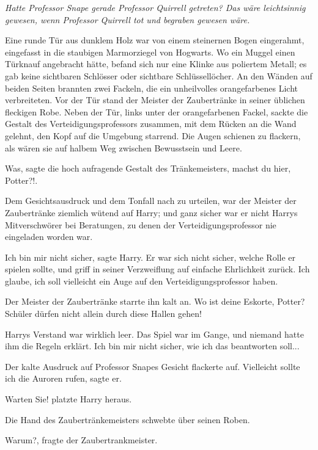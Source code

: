 \emph{Hatte Professor Snape gerade Professor Quirrell getreten? Das wäre
leichtsinnig gewesen, wenn Professor Quirrell tot und begraben gewesen wäre.}

Eine runde Tür aus dunklem Holz war von einem steinernen Bogen eingerahmt,
eingefasst in die staubigen Marmorziegel von Hogwarts. Wo ein Muggel einen
Türknauf angebracht hätte, befand sich nur eine Klinke aus poliertem Metall; es
gab keine sichtbaren Schlösser oder sichtbare Schlüssellöcher. An den Wänden auf
beiden Seiten brannten zwei Fackeln, die ein unheilvolles orangefarbenes Licht
verbreiteten. Vor der Tür stand der Meister der Zaubertränke in seiner üblichen
fleckigen Robe. Neben der Tür, links unter der orangefarbenen Fackel, sackte die
Gestalt des Verteidigungsprofessors zusammen, mit dem Rücken an die Wand
gelehnt, den Kopf auf die Umgebung starrend. Die Augen schienen zu flackern, als
wären sie auf halbem Weg zwischen Bewusstsein und Leere.

\glqq{}Was\grqq{}, sagte die hoch aufragende Gestalt des Tränkemeisters, \glqq{}
machst du hier, Potter?!\grqq{}.

Dem Gesichtsausdruck und dem Tonfall nach zu urteilen, war der Meister der
Zaubertränke ziemlich wütend auf Harry; und ganz sicher war er nicht Harrys
Mitverschwörer bei Beratungen, zu denen der Verteidigungsprofessor nie
eingeladen worden war.

\glqq{}Ich bin mir nicht sicher\grqq{}, sagte Harry. Er war sich nicht sicher,
welche Rolle er spielen sollte, und griff in seiner Verzweiflung auf einfache
Ehrlichkeit zurück. \glqq{}Ich glaube, ich soll vielleicht ein Auge auf den
Verteidigungsprofessor haben.\grqq{}

Der Meister der Zaubertränke starrte ihn kalt an. \glqq{}Wo ist deine Eskorte,
Potter? Schüler dürfen nicht allein durch diese Hallen gehen!\grqq{}

Harrys Verstand war wirklich leer. Das Spiel war im Gange, und niemand hatte ihm
die Regeln erklärt. \glqq{}Ich bin mir nicht sicher, wie ich das beantworten
soll...\grqq{}

Der kalte Ausdruck auf Professor Snapes Gesicht flackerte auf. \glqq{}Vielleicht
sollte ich die Auroren rufen\grqq{}, sagte er.

\glqq{}Warten Sie!\grqq{} platzte Harry heraus.

Die Hand des Zaubertränkemeisters schwebte über seinen Roben.

\glqq{}Warum?\grqq{}, fragte der Zaubertrankmeister.

